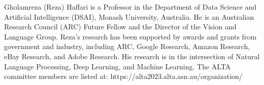 Gholamreza (Reza) Haffari is a Professor in the Department of Data Science and Artificial Intelligence (DSAI), Monash University, Australia. He is an Australian Research Council (ARC) Future Fellow and the Director of the Vision and Language Group. Reza’s research has been supported by awards and grants from government and industry, including ARC, Google Research, Amazon Research, eBay Research, and Adobe Research. His research is in the intersection of Natural Language Processing, Deep Learning, and Machine Learning.
The ALTA committee members are listed at:
https://alta2023.alta.asn.au/organization/
